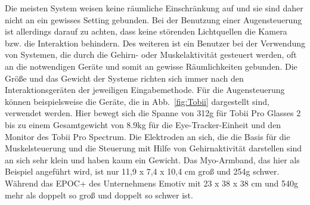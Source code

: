 \newline \newline 
Die meisten System weisen keine räumliche Einschränkung auf und sie sind daher nicht an ein gewisses Setting gebunden. Bei der Benutzung einer Augensteuerung ist allerdings darauf zu achten, dass keine störenden Lichtquellen die Kamera bzw. die Interaktion behindern. Des weiteren ist ein Benutzer bei der Verwendung von Systemen, die durch die Gehirn- oder Muskelaktivität gesteuert werden, oft an die notwendigen Geräte und somit an gewisse Räumlichkeiten gebunden.
\newline \newline
Die Größe und das Gewicht der Systeme richten sich immer nach den Interaktionsgeräten der jeweiligen Eingabemethode. Für die Augensteuerung können beispielsweise die Geräte, die in Abb.~\ref{fig:Tobii} dargestellt sind, verwendet werden. Hier bewegt sich die Spanne von 312g für Tobii Pro Glasses 2 bis zu einem Gesamtgewicht von 8.9kg für die Eye-Tracker-Einheit und den Monitor des Tobii Pro Spectrum. Die Elektroden an sich, die die Basis für die Muskelsteuerung und die Steuerung mit Hilfe von Gehirnaktivität darstellen sind an sich sehr klein und haben kaum ein Gewicht. Das Myo-Armband, das hier als Beispiel angeführt wird, ist nur 11,9 x 7,4 x 10,4 cm groß und 254g schwer. Während das EPOC+ des Unternehmens Emotiv mit 23 x 38 x 38 cm und 540g mehr als doppelt so groß und doppelt so schwer ist.
%
%
